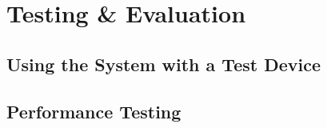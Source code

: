 \chapter{Testing \& Evaluation} \label{cha:testing}
\section{Using the System with a Test Device}
\section{Performance Testing}
